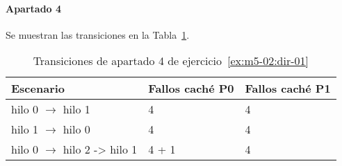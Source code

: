 \paragraph{Apartado 4}

Se muestran las transiciones en la Tabla~\ref{tab:sol-jan-2015d}.

\begin{table}[!htbp]

\begin{tabular}{|l|l|l|}

\hline
Escenario & Fallos caché P0 & Fallos caché P1\\
\hline
\hline

hilo 0 $\rightarrow$ hilo 1 &
4 & 4
\\
\hline

hilo 1 $\rightarrow$ hilo 0 &
4 & 4
\\
\hline

hilo 0 $\rightarrow$ hilo 2 -> hilo 1 &
4 + 1 & 4
\\
\hline

\end{tabular}

\caption{Transiciones de apartado 4 de ejercicio~\ref{ex:m5-02:dir-01}}
\label{tab:sol-jan-2015d}
\end{table}

